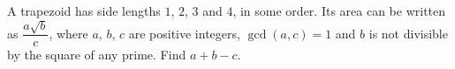 A trapezoid has side lengths $1$, $2$, $3$ and $4$, in some order. Its area can be written as $\dfrac{a\sqrt b}{c}$, where $a$, $b$, $c$ are positive integers, $\gcd(a,c)=1$ and $b$ is not divisible by the square of any prime. Find $a+b-c$.
